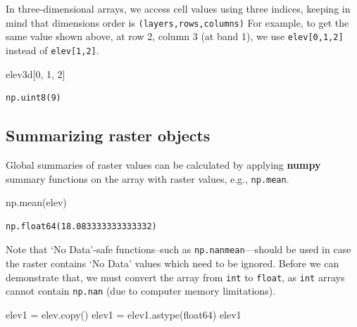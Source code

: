 \documentclass[
  letterpaper,
]{krantz}
\newenvironment{Shaded}{\begin{snugshade}}{\end{snugshade}}
\newcommand{\DecValTok}[1]{\textcolor[rgb]{0.68,0.00,0.00}{#1}}
\newcommand{\NormalTok}[1]{\textcolor[rgb]{0.00,0.23,0.31}{#1}}
\newcommand{\OperatorTok}[1]{\textcolor[rgb]{0.37,0.37,0.37}{#1}}
\newcommand{\StringTok}[1]{\textcolor[rgb]{0.13,0.47,0.30}{#1}}
\begin{document}
In three-dimensional arrays, we access cell values using three indices,
keeping in mind that dimensions order is \texttt{(layers,rows,columns)}
For example, to get the same value shown above, at row 2, column 3 (at
band 1), we use \texttt{elev{[}0,1,2{]}} instead of
\texttt{elev{[}1,2{]}}.

\begin{Shaded}
\begin{Highlighting}[]
\NormalTok{elev3d[}\DecValTok{0}\NormalTok{, }\DecValTok{1}\NormalTok{, }\DecValTok{2}\NormalTok{] }
\end{Highlighting}
\end{Shaded}

\begin{verbatim}
np.uint8(9)
\end{verbatim}

\subsection{Summarizing raster
objects}\label{sec-summarizing-raster-objects}

Global summaries of raster values can be calculated by applying
\textbf{numpy} summary functions on the array with raster values, e.g.,
\texttt{np.mean}.

\begin{Shaded}
\begin{Highlighting}[]
\NormalTok{np.mean(elev)}
\end{Highlighting}
\end{Shaded}

\begin{verbatim}
np.float64(18.083333333333332)
\end{verbatim}

Note that `No Data'-safe functions--such as \texttt{np.nanmean}---should
be used in case the raster contains `No Data' values which need to be
ignored. Before we can demonstrate that, we must convert the array from
\texttt{int} to \texttt{float}, as \texttt{int} arrays cannot contain
\texttt{np.nan} (due to computer memory limitations).

\begin{Shaded}
\begin{Highlighting}[]
\NormalTok{elev1 }\OperatorTok{=}\NormalTok{ elev.copy()}
\NormalTok{elev1 }\OperatorTok{=}\NormalTok{ elev1.astype(}\StringTok{\textquotesingle{}float64\textquotesingle{}}\NormalTok{)}
\NormalTok{elev1}
\end{Highlighting}
\end{Shaded}
\end{document}
